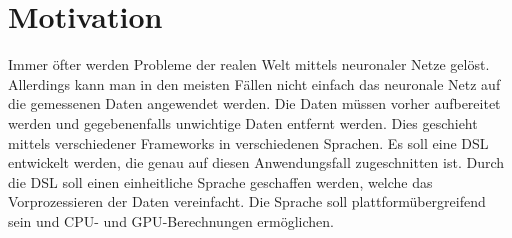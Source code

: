 
\chapter{Motivation}
Immer öfter werden Probleme der realen Welt mittels neuronaler Netze gelöst.
Allerdings kann man in den meisten Fällen nicht einfach das neuronale Netz auf die gemessenen Daten angewendet werden.
Die Daten müssen vorher aufbereitet werden und gegebenenfalls unwichtige Daten entfernt werden.
Dies geschieht mittels verschiedener Frameworks in verschiedenen Sprachen.
Es soll eine \ac{DSL} entwickelt werden, die genau auf diesen Anwendungsfall zugeschnitten ist.
Durch die \ac{DSL} soll einen einheitliche Sprache geschaffen werden, welche das Vorprozessieren der Daten vereinfacht.
Die Sprache soll plattformübergreifend sein und \ac{CPU}- und \ac{GPU}-Berechnungen ermöglichen.

\endinput
